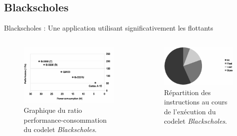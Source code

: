 \documentclass{beamer}
\begin{document}
\subsection{Blackscholes}
\begin{frame}{Blackscholes : Une application utilisant significativement les flottants}

\begin{columns}

\begin{column}{0.4\paperwidth}
\begin{figure}
\centering
\includegraphics[width=\textwidth]{Blackscholes.eps}
\caption{\label{Blackscholes}Graphique du ratio performance-consommation du codelet \textit{Blackscholes}.}
\end{figure}
\end{column}

\begin{column}{0.4\paperwidth}
\begin{figure}
\centering
\includegraphics[width=\textwidth]{Blackscholes_instr.eps}
\caption{\label{Blackscholes_instr}Répartition des instructions au cours de l'exécution du codelet \textit{Blackscholes}.}
\end{figure}
\end{column}

\end{columns}

\end{frame}
\end{document}
